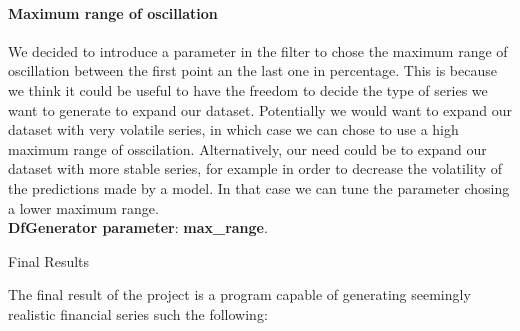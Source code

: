 \documentclass{article}
\begin{document}
\begin{multicols}{2}
    \paragraph*{Maximum range of oscillation}
    We decided to introduce a parameter in the filter to chose the maximum range of oscillation between the first point an the last one in percentage. This is because we think it could be useful to have the freedom to decide the type of series we want 
    to generate to expand our dataset. Potentially we would want to expand our dataset with very volatile series, in which case we can chose to use a high maximum range of osscilation. Alternatively, our need could be to expand our dataset with more stable series, for example in order to decrease 
    the volatility of the predictions made by a model. In that case we can tune the parameter chosing a lower maximum range.\\
    \textbf{DfGenerator parameter}:  \textbf{max\_range}.

    \end{multicols}
    \newpage
    \begin{center}
        {\huge{Final Results}}
    \end{center} 
    The final result of the project is a program capable of generating seemingly realistic financial series such the following:
\end{document}

